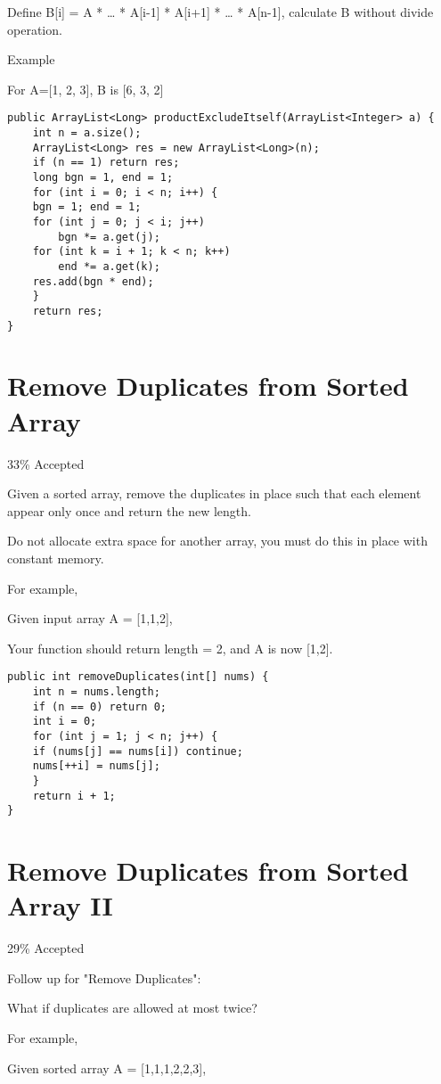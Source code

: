 \documentclass[12pt]{book}
\begin{document}
Define B[i] = A\footnotemark[1]{} * \ldots{} * A[i-1] * A[i+1] * \ldots{} * A[n-1], calculate B without divide operation.

Example

For A=[1, 2, 3], B is [6, 3, 2]
\lstset{language=java,label= ,caption= ,numbers=none}
\begin{lstlisting}
public ArrayList<Long> productExcludeItself(ArrayList<Integer> a) {
    int n = a.size();
    ArrayList<Long> res = new ArrayList<Long>(n);
    if (n == 1) return res;
    long bgn = 1, end = 1;
    for (int i = 0; i < n; i++) {
	bgn = 1; end = 1;
	for (int j = 0; j < i; j++) 
	    bgn *= a.get(j);
	for (int k = i + 1; k < n; k++) 
	    end *= a.get(k);
	res.add(bgn * end);
    }
    return res;
}
\end{lstlisting}
\chapter{Remove Duplicates from Sorted Array}
\label{sec-52}

33\% Accepted

Given a sorted array, remove the duplicates in place such that each element appear only once and return the new length.

Do not allocate extra space for another array, you must do this in place with constant memory.

For example,

Given input array A = [1,1,2],

Your function should return length = 2, and A is now [1,2].
\lstset{language=java,label= ,caption= ,numbers=none}
\begin{lstlisting}
public int removeDuplicates(int[] nums) {
    int n = nums.length;
    if (n == 0) return 0;
    int i = 0;
    for (int j = 1; j < n; j++) {
	if (nums[j] == nums[i]) continue;
	nums[++i] = nums[j];
    }
    return i + 1;
}
\end{lstlisting}
\chapter{Remove Duplicates from Sorted Array II}
\label{sec-53}

29\% Accepted

Follow up for "Remove Duplicates":

What if duplicates are allowed at most twice?

For example,

Given sorted array A = [1,1,1,2,2,3],
\end{document}
